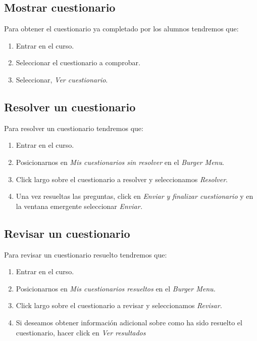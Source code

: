 \subsection{Mostrar cuestionario}

Para obtener el cuestionario ya completado por los alumnos tendremos que:

\begin{enumerate}
	\item Entrar en el curso.
	\item Seleccionar el cuestionario a comprobar.
	\item Seleccionar, \emph{Ver cuestionario}.
\end{enumerate}


\subsection{Resolver un cuestionario}

Para resolver un cuestionario tendremos que:
\begin{enumerate}
	\item Entrar en el curso.
	\item Posicionarnos en \emph{Mis cuestionarios sin resolver} en el \emph{Burger Menu}.
	\item Click largo sobre el cuestionario a resolver y seleccionamos \emph{Resolver}.
	\item Una vez resueltas las preguntas, click en \emph{Enviar y finalizar cuestionario} y en la ventana emergente seleccionar  \emph{Enviar.}
\end{enumerate}



\subsection{Revisar un cuestionario}

Para revisar un cuestionario resuelto tendremos que:
\begin{enumerate}
	\item Entrar en el curso.
	\item Posicionarnos en \emph{Mis cuestionarios resueltos} en el \emph{Burger Menu.}
	\item Click largo sobre el cuestionario a revisar y seleccionamos \emph{Revisar.}
	\item Si deseamos obtener información adicional sobre como ha sido resuelto el cuestionario, hacer click en \emph{Ver resultados}
\end{enumerate}


